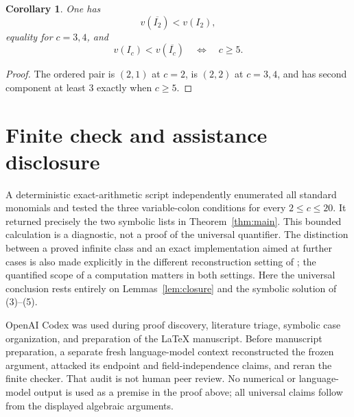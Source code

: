 \documentclass[11pt]{article}
\newtheorem{corollary}[theorem]{Corollary}
\begin{document}
\begin{corollary}
One has
\[
 v(\overline{I_2})<v(I_2),
\]
equality for \(c=3,4\), and
\[
 v(I_c)<v(\overline{I_c})
 \quad\Longleftrightarrow\quad c\geq5.
\]
\end{corollary}

\begin{proof}
The ordered pair is \((2,1)\) at \(c=2\), is \((2,2)\) at \(c=3,4\),
and has second component at least \(3\) exactly when \(c\geq5\).
\end{proof}

\section{Finite check and assistance disclosure}

A deterministic exact-arithmetic script independently enumerated all
standard monomials and tested the three variable-colon conditions for every
\(2\leq c\leq20\).  It returned precisely the two symbolic lists in
Theorem~\ref{thm:main}.  This bounded calculation is a diagnostic, not a
proof of the universal quantifier.  The distinction between a proved
infinite class and an exact implementation aimed at further cases is also
made explicitly in the different reconstruction setting of
\cite{Zeng2026Multiplicity}; the quantified scope of a computation matters
in both settings.  Here the universal conclusion rests entirely on
Lemmas~\ref{lem:closure} and the symbolic solution of (3)--(5).

OpenAI Codex was used during proof discovery, literature triage, symbolic
case organization, and preparation of the \LaTeX{} manuscript.  Before
manuscript preparation, a separate fresh language-model context reconstructed
the frozen argument, attacked its endpoint and field-independence claims, and
reran the finite checker.  That audit is not human peer review.  No numerical
or language-model output is used as a premise in the proof above; all
universal claims follow from the displayed algebraic arguments.



\end{document}
